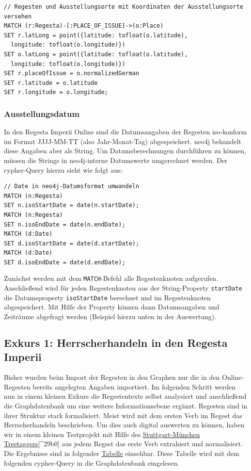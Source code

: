 \documentclass[12pt,ngerman,]{article}
\begin{document}
\begin{verbatim}
// Regesten und Ausstellungsorte mit Koordinaten der Ausstellungsorte versehen
MATCH (r:Regesta)-[:PLACE_OF_ISSUE]->(o:Place)
SET r.latLong = point({latitude: tofloat(o.latitude),
  longitude: tofloat(o.longitude)})
SET o.latLong = point({latitude: tofloat(o.latitude),
  longitude: tofloat(o.longitude)})
SET r.placeOfIssue = o.normalizedGerman
SET r.latitude = o.latitude
SET r.longitude = o.longitude;
\end{verbatim}

\subsubsection{Ausstellungsdatum}\label{ausstellungsdatum}

In den Regesta Imperii Online sind die Datumsangaben der Regesten
iso-konform im Format JJJJ-MM-TT (also Jahr-Monat-Tag) abgespeichert.
neo4j behandelt diese Angaben aber als String. Um Datumsberechnungen
durchführen zu können, müssen die Strings in neo4j-interne Datumswerte
umgerechnet werden. Der cypher-Query hierzu sieht wie folgt aus:

\begin{verbatim}
// Date in neo4j-Datumsformat umwandeln
MATCH (n:Regesta)
SET n.isoStartDate = date(n.startDate);
MATCH (n:Regesta)
SET n.isoEndDate = date(n.endDate);
MATCH (d:Date)
SET d.isoStartDate = date(d.startDate);
MATCH (d:Date)
SET d.isoEndDate = date(d.endDate);
\end{verbatim}

Zunächst werden mit dem \texttt{MATCH}-Befehl alle Regestenknoten
aufgerufen. Anschließend wird für jeden Regestenknoten aus der
String-Property \texttt{startDate} die Datumsproperty
\texttt{isoStartDate} berechnet und im Regestenknoten abgespeichert. Mit
Hilfe der Property können dann Datumsangaben und Zeiträume abgefragt
werden (Beispiel hierzu unten in der Auswertung).

\subsection{Exkurs 1: Herrscherhandeln in den Regesta
Imperii}\label{exkurs-1-herrscherhandeln-in-den-regesta-imperii}

Bisher wurden beim Import der Regesten in den Graphen nur die in den
Online-Regesten bereits angelegten Angaben importiert. Im folgenden
Schritt werden nun in einem kleinen Exkurs die Regestentexte selbst
analysiert und anschließend die Graphdatenbank um eine weitere
Informationsebene ergänzt. Regesten sind in ihrer Struktur stark
formalisiert. Meist wird mit dem ersten Verb im Regest das
Herrscherhandeln beschrieben. Um dies auch digital auswerten zu können,
haben wir in einem kleinen Testprojekt mit Hilfe des
\href{http://www.cis.uni-muenchen.de/~schmid/tools/TreeTagger/}{Stuttgart-München
Treetaggers}{[}\^{}29b0{]} aus jedem Regest das erste Verb extrahiert
und normalisiert. Die Ergebnisse sind in folgender
\href{https://docs.google.com/spreadsheets/d/1nlbZmQYcT1E3Z58yPmcnulcNQc1e3111Di-4huhV-FY/edit?usp=sharing}{Tabelle}
einsehbar. Diese Tabelle wird mit dem folgenden cypher-Query in die
Graphdatenbank eingelesen.
\end{document}
